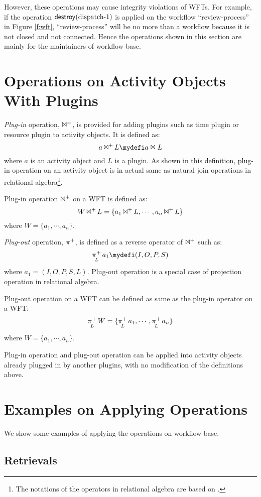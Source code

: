 However, these operations may cause integrity violations of WFTs.  For
example, if the operation ${\sf destroy}(\mbox{dispatch-1})$ is
applied on the workflow ``review-process'' in Figure \ref{f:wft},
``review-process'' will be no more than a workflow because it is not
closed and not connected.  Hence the operations shown in this section
are mainly for the maintainers of workflow base.

\section{Operations on Activity Objects With Plugins}

{\em Plug-in} operation, $\mathop{\Join^+}$, is provided for adding plugins
such as time plugin or resource plugin to activity objects.  It is
defined as: 
\[
 a \wfbplugin L \mydefi a \Join L 
\]
 where $a$ is an activity object and $L$ is a plugin.  As shown in this
definition, plug-in operation on an activity object is in actual same as
natural join operations in relational algebra\footnote{The notations of
the operators in relational algebra are based on
\cite{ullman:database88:1}.}.

Plug-in operation $\mathop{\Join^+}$ on a WFT is defined as:
\[
 W \mathop{\Join^+} L = \{a_1 \mathop{\Join^+} L, \cdots, a_n \mathop{\Join^+} L\}
\]
where $W=\{a_1, \cdots, a_n\}$.

{\em Plug-out} operation, $\mathop{\pi^+}$, is defined as a reverse operator of
$\mathop{\Join^+}$ such as:
\[
 \wfbplugout_{L} a_1 \mydefi (I, O, P, S)
\]
where $a_1 = (I, O, P, S, L)$.  Plug-out operation is a special case of 
projection operation in relational algebra.

Plug-out operation on a WFT can be defined as same as the plug-in
operator on a WFT:
\[
 \mathop{\pi^+}_{L} W = \{\mathop{\pi^+}_{L} a_1, \cdots, \mathop{\pi^+}_{L} a_n\} 
\]
where $W = \{a_1, \cdots, a_n\}$.

Plug-in operation and plug-out operation can be applied into activity
objects already plugged in by another plugins, with no modification of
the definitions above.

\section{Examples on Applying Operations}

We show some examples of applying the operations on workflow-base.

\subsection{Retrievals}

